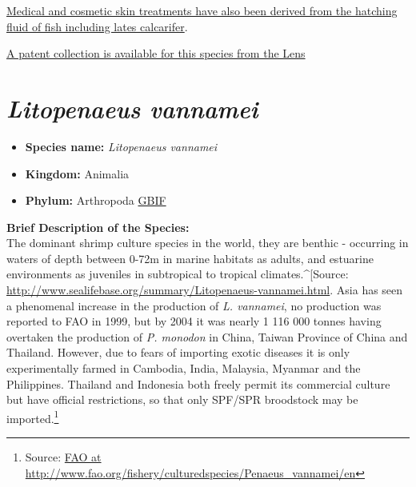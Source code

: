 \documentclass[]{book}
\providecommand{\tightlist}{%
  \setlength{\itemsep}{0pt}\setlength{\parskip}{0pt}}
\theoremstyle{definition}
\theoremstyle{definition}
\theoremstyle{definition}
\theoremstyle{remark}
\begin{document}
\href{WO\%202014/094918\%20A1}{Medical and cosmetic skin treatments have
also been derived from the hatching fluid of fish including lates
calcarifer}.

\href{https://www.lens.org/lens/collection/25319}{A patent collection is
available for this species from the Lens}

\hypertarget{litopenaeus-vannamei}{%
\section{\texorpdfstring{\emph{Litopenaeus
vannamei}}{Litopenaeus vannamei}}\label{litopenaeus-vannamei}}

\begin{itemize}
\tightlist
\item
  \textbf{Species name:} \emph{Litopenaeus vannamei}
\item
  \textbf{Kingdom:} Animalia
\item
  \textbf{Phylum:} Arthropoda
  \href{https://www.gbif.org/species/2223871}{GBIF}
\end{itemize}

\textbf{Brief Description of the Species:}\\
The dominant shrimp culture species in the world, they are benthic -
occurring in waters of depth between 0-72m in marine habitats as adults,
and estuarine environments as juveniles in subtropical to tropical
climates.\^{}{[}Source:
\url{http://www.sealifebase.org/summary/Litopenaeus-vannamei.html}. Asia
has seen a phenomenal increase in the production of \emph{L. vannamei},
no production was reported to FAO in 1999, but by 2004 it was nearly 1
116 000 tonnes having overtaken the production of \emph{P. monodon} in
China, Taiwan Province of China and Thailand. However, due to fears of
importing exotic diseases it is only experimentally farmed in Cambodia,
India, Malaysia, Myanmar and the Philippines. Thailand and Indonesia
both freely permit its commercial culture but have official
restrictions, so that only SPF/SPR broodstock may be imported.\footnote{Source:
  \href{http://www.fao.org/fishery/culturedspecies/Penaeus_vannamei/en}{FAO
  at http://www.fao.org/fishery/culturedspecies/Penaeus\_vannamei/en}}
\end{document}
